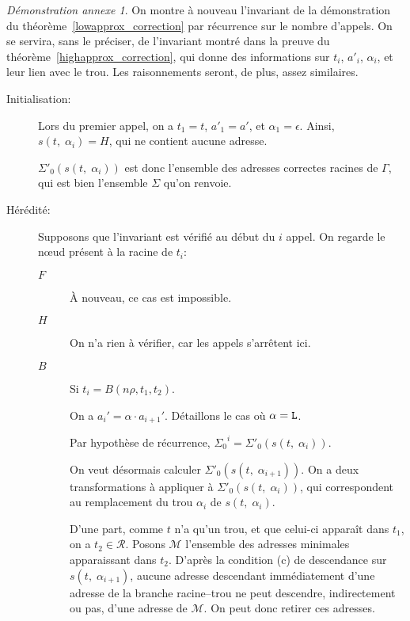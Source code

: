 \documentclass[11pt,a4paper]{article}
\theoremstyle{plain}
\theoremstyle{definition}
\theoremstyle{remark}
\newtheorem{demonstrationappendix}{Démonstration annexe}
\newcommand*{\sequent}{\Gamma}
\newcommand*{\Left}{\textnormal{\texttt{L}}}
\newcommand*{\representations}{\ensuremath{\mathcal{R}}}
\newcommand*{\lowapprox}{\ensuremath{\Sigma_0}}
\newcommand*{\lowapproxspec}{\ensuremath{\Sigma'_0}}
\newcommand*{\treesimplify}{\ensuremath{s}}
\newcommand*{\cdespartial}{(c)}
\begin{document}
\begin{demonstrationappendix}
    \label{lowapprox_correction_proof}
    On montre à nouveau l'invariant de la démonstration du théorème~\ref{lowapprox_correction} par récurrence sur le nombre d'appels. On se servira, sans le préciser, de l'invariant montré dans la preuve du théorème~\ref{highapprox_correction}, qui donne des informations sur $t_i$, $a'_i$, $\alpha_i$, et leur lien avec le trou. Les raisonnements seront, de plus, assez similaires.

    \begin{description}
        \item[Initialisation:] Lors du premier appel, on a $t_1 = t$, $a'_1 = a'$, et $\alpha_1 = \epsilon$. Ainsi, $\treesimplify( t, \; {\alpha}_i ) = H$, qui ne contient aucune adresse.
        
        $\lowapproxspec \left( \treesimplify( t, \; {\alpha}_i ) \right)$ est donc l'ensemble des adresses correctes racines de $\sequent$, qui est bien l'ensemble $\Sigma$ qu'on renvoie.

        \item[Hérédité:] Supposons que l'invariant est vérifié au début du $i$\ieme{} appel. On regarde le n\oe ud présent à la racine de $t_i$:

        \begin{description}
            \item[$F$]
                À nouveau, ce cas est impossible.
                
            \item[$H$]
                On n'a rien à vérifier, car les appels s'arrêtent ici. 

            \item[$B$] Si $t_i = B(n\rho, t_1, t_2)$.

            On a $a_i' = \alpha \cdot a_{i+1}'$. Détaillons le cas où $\alpha = \Left$.

            Par hypothèse de récurrence, $\lowapprox^{i} = \lowapproxspec \left( \treesimplify( t, \; {\alpha}_i ) \right)$. 
            
            On veut désormais calculer $\lowapproxspec \left( \treesimplify( t, \; {\alpha}_{i+1} ) \right)$. On a deux transformations à appliquer à $\lowapproxspec \left( \treesimplify( t, \; {\alpha}_{i} ) \right)$, qui correspondent au remplacement du trou $\alpha_{i}$ de $\treesimplify( t, \; {\alpha}_i )$.
            
            D'une part, comme $t$ n'a qu'un trou, et que celui-ci apparaît dans $t_1$, on a $t_2 \in \representations$. Posons $\mathcal{M}$ l'ensemble des adresses minimales apparaissant dans $t_2$. D'après la condition \cdespartial{} de descendance sur $\treesimplify( t, \; {\alpha}_{i+1} )$, aucune adresse descendant immédiatement d'une adresse de la branche racine--trou ne peut descendre, indirectement ou pas, d'une adresse de $\mathcal{M}$. On peut donc retirer ces adresses.


\end{description}
\end{description}
\end{demonstrationappendix}
\end{document}
